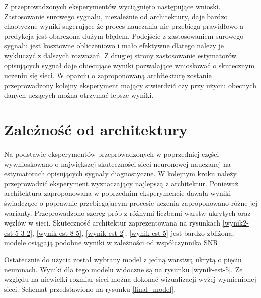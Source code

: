 \documentclass[inzynierska]{pwr_wmat_praca_dyplomowa}
\theoremstyle{plain}
\numberwithin{theorem}{chapter}
\theoremstyle{definition}
\numberwithin{theorem}{chapter}
\begin{document}
Z przeprowadzonych eksperymentów wyciągnięto następujące wnioski. Zastosowanie surowego sygnału, niezależnie od architektury, daje bardzo chaotyczne wyniki sugerujące że proces nauczania nie przebiega prawidłowo a predykcja jest obarczona dużym błędem. Podejście z zastosowaniem surowego sygnału jest kosztowne obliczeniowo i mało efektywne dlatego należy je wykluczyć z dalszych rozważań. Z drugiej strony zastosowanie estymatorów opisujących sygnał daje obiecujące wyniki pozwalające wnioskować o skutecznym uczeniu się sieci. W oparciu o zaproponowaną architekturę zostanie przeprowadzony kolejny eksperyment mający stwierdzić czy przy użyciu obecnych danych uczących można otrzymać lepsze wyniki.

\section{Zależność od architektury}
Na podstawie eksperymentów przeprowadzonych w poprzedniej części wywnioskowano o największej skuteczności sieci neuronowej nauczanej na estymatorach opisujących sygnały diagnostyczne. W kolejnym kroku należy przeprowadzić eksperyment wyznaczający najlepszą z architektur. Ponieważ architektura zaproponowana w poprzednim eksperymencie dawała wyniki świadczące o poprawnie przebiegającym procesie uczenia zaproponowano różne jej warianty. Przeprowadzono szereg prób z różnymi liczbami warstw ukrytych oraz węzłów w sieci. Skuteczność architektur zaprezentowana na rysunkach \ref{wynik2-est-5-3-2}, \ref{wynik-est-8-5}, \ref{wynik-est-2}, \ref{wynik-est-5} jest bardzo zbliżona, modele osiągają podobne wyniki w zależności od współczynnika SNR.

 Ostatecznie do użycia został wybrany model z jedną warstwą ukrytą o pięciu neuronach. Wyniki dla tego modelu widoczne są na rysunku \ref{wynik-est-5}. Ze względu na niewielki rozmiar sieci można dokonać wizualizacji wyżej wymienionej sieci. Schemat przedstawiono na rysunku \ref{final_model}. 
\end{document}
